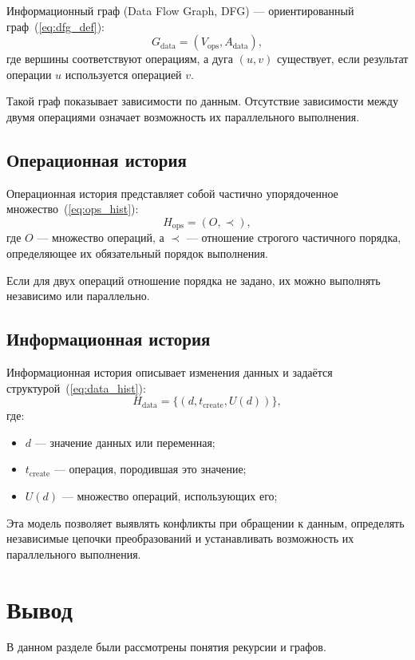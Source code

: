 Информационный граф (Data Flow Graph, DFG) --- ориентированный граф~(\ref{eq:dfg_def}):
\begin{equation}
	G_{\text{data}} = (V_{\text{ops}}, A_{\text{data}}),
	\label{eq:dfg_def}
\end{equation}
где вершины соответствуют операциям, а дуга $(u, v)$ существует, если результат операции $u$ используется операцией $v$.

Такой граф показывает зависимости по данным. Отсутствие зависимости между двумя операциями означает возможность их параллельного выполнения.

\subsection{Операционная история}

Операционная история представляет собой частично упорядоченное множество~(\ref{eq:ops_hist}):
\begin{equation}
	H_{\text{ops}} = (O, \prec),
	\label{eq:ops_hist}
\end{equation}
где $O$ --- множество операций, а $\prec$ --- отношение строгого частичного порядка, определяющее их обязательный порядок выполнения.

Если для двух операций отношение порядка не задано, их можно выполнять независимо или параллельно.

\subsection{Информационная история}

Информационная история описывает изменения данных и задаётся структурой~(\ref{eq:data_hist}):
\begin{equation}
	H_{\text{data}} = \{ (d, t_{\text{create}}, U(d)) \},
	\label{eq:data_hist}
\end{equation}
где:
\begin{itemize}
	\item $d$ --- значение данных или переменная;
	\item $t_{\text{create}}$ --- операция, породившая это значение;
	\item $U(d)$ --- множество операций, использующих его;
\end{itemize}

Эта модель позволяет выявлять конфликты при обращении к данным, определять независимые цепочки преобразований и устанавливать возможность их параллельного выполнения.

\section*{Вывод}

В данном разделе были рассмотрены понятия рекурсии и графов.

\clearpage
